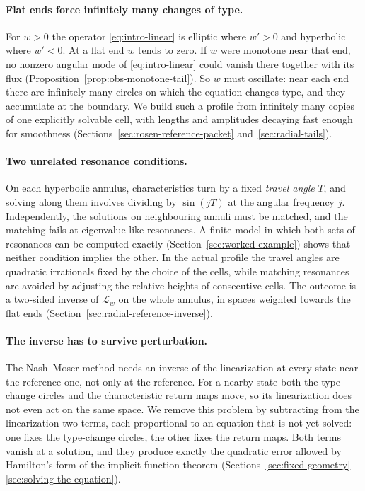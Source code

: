 \paragraph{Flat ends force infinitely many changes of type.}
For $w>0$ the operator \eqref{eq:intro-linear} is elliptic where $w'>0$
and hyperbolic where $w'<0$. At a flat end $w$ tends to zero. If $w$
were monotone near that end, no nonzero angular mode of
\eqref{eq:intro-linear} could vanish there together with its flux
(Proposition~\ref{prop:obs-monotone-tail}). So $w$ must oscillate: near
each end there are infinitely many circles on which the equation
changes type, and they accumulate at the boundary. We build such a
profile from infinitely many copies of one explicitly solvable cell,
with lengths and amplitudes decaying fast enough for smoothness
(Sections~\ref{sec:rosen-reference-packet} and~\ref{sec:radial-tails}).

\paragraph{Two unrelated resonance conditions.}
On each hyperbolic annulus, characteristics turn by a fixed
\emph{travel angle} $T$, and solving along them involves dividing by
$\sin(jT)$ at the angular frequency $j$. Independently, the solutions
on neighbouring annuli must be matched, and the matching fails at
eigenvalue-like resonances. A finite model in which both sets of
resonances can be computed exactly (Section~\ref{sec:worked-example})
shows that neither condition implies the other. In the actual profile
the travel angles are quadratic irrationals fixed by the choice of the
cells, while matching resonances are avoided by adjusting the relative
heights of consecutive cells. The outcome is a two-sided inverse of
$\mathscr L_w$ on the whole annulus, in spaces weighted towards the
flat ends (Section~\ref{sec:radial-reference-inverse}).

\paragraph{The inverse has to survive perturbation.}
The Nash--Moser method needs an inverse of the linearization at every
state near the reference one, not only at the reference. For a nearby
state both the type-change circles and the characteristic return maps
move, so its linearization does not even act on the same space. We
remove this problem by subtracting from the linearization two terms,
each proportional to an equation that is not yet solved: one fixes the
type-change circles, the other fixes the return maps. Both terms vanish
at a solution, and they produce exactly the quadratic error allowed by
Hamilton's form of the implicit function theorem \cite{Hamilton1982}
(Sections~\ref{sec:fixed-geometry}--\ref{sec:solving-the-equation}).

